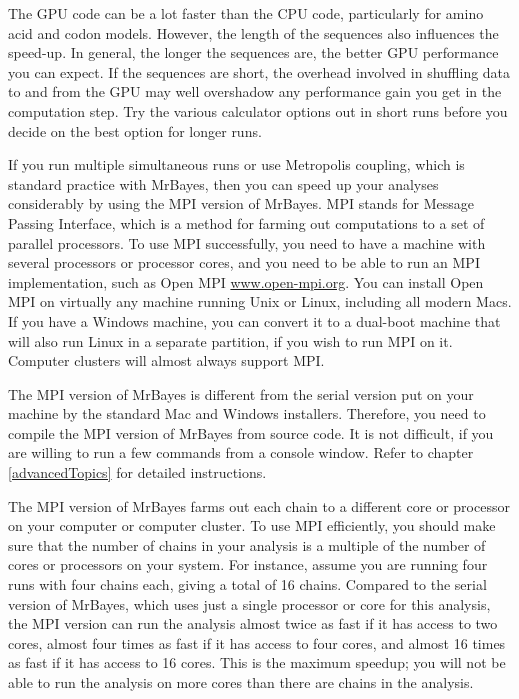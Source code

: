 \documentclass[12pt]{book}
\begin{document}
The GPU code can be a lot faster than the CPU code, particularly for amino acid and codon models.
However, the length of the sequences also influences the speed-up. In general, the longer the
sequences are, the better GPU performance you can expect. If the sequences are short, the overhead
involved in shuffling data to and from the GPU may well overshadow any performance gain you get in
the computation step. Try the various calculator options out in short runs before you decide on the
best option for longer runs.

If you run multiple simultaneous runs or use Metropolis coupling, which is standard practice with
MrBayes, then you can speed up your analyses considerably by using the MPI version of MrBayes. MPI
stands for Message Passing Interface, which is a method for farming out computations to a set of
parallel processors.  To use MPI successfully, you need to have a machine with several processors
or processor cores, and you need to be able to run an MPI implementation, such as Open MPI
\url{www.open-mpi.org}. You can install Open MPI on virtually any machine running Unix or Linux,
including all modern Macs. If you have a Windows machine, you can convert it to a dual-boot machine
that will also run Linux in a separate partition, if you wish to run MPI on it. Computer clusters
will almost always support MPI.

The MPI version of MrBayes is different from the serial version put on your machine by the standard
Mac and Windows installers. Therefore, you need to compile the MPI version of MrBayes from source
code. It is not difficult, if you are willing to run a few commands from a console window. Refer to
chapter \ref{advancedTopics} for detailed instructions.

The MPI version of MrBayes farms out each chain to a different core or processor on your computer
or computer cluster. To use MPI efficiently, you should make sure that the number of chains in your
analysis is a multiple of the number of cores or processors on your system. For instance, assume
you are running four runs with four chains each, giving a total of 16 chains. Compared to the
serial version of MrBayes, which uses just a single processor or core for this analysis, the MPI
version can run the analysis almost twice as fast if it has access to two cores, almost four times
as fast if it has access to four cores, and almost 16 times as fast if it has access to 16 cores.
This is the maximum speedup; you will not be able to run the analysis on more cores than there are
chains in the analysis.
\end{document}
